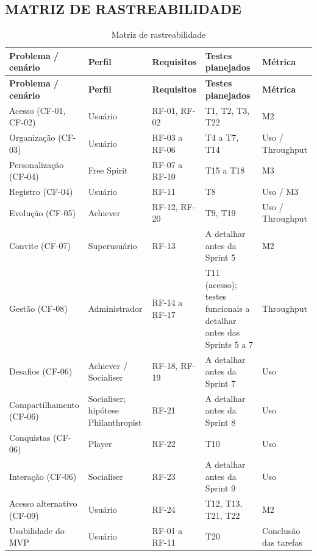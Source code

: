 \subsection{MATRIZ DE RASTREABILIDADE}

\begingroup
\small
\setlength{\tabcolsep}{4pt}
\renewcommand{\arraystretch}{1.2}
\begin{longtable}{|>{\raggedright\arraybackslash}p{}|>{\raggedright\arraybackslash}p{}|>{\raggedright\arraybackslash}p{}|>{\raggedright\arraybackslash}p{}|>{\raggedright\arraybackslash}p{}|}
\caption{Matriz de rastreabilidade}\\
\hline
\textbf{Problema / cenário} & \textbf{Perfil} & \textbf{Requisitos} & \textbf{Testes planejados} & \textbf{Métrica} \\ \hline
\endfirsthead
\textbf{Problema / cenário} & \textbf{Perfil} & \textbf{Requisitos} & \textbf{Testes planejados} & \textbf{Métrica} \\ \hline
\endhead
Acesso (CF-01, CF-02) & Usuário & RF-01, RF-02 & T1, T2, T3, T22 & M2 \\ \hline
Organização (CF-03) & Usuário & RF-03 a RF-06 & T4 a T7, T14 & Uso / Throughput \\ \hline
Personalização (CF-04) & Free Spirit & RF-07 a RF-10 & T15 a T18 & M3 \\ \hline
Registro (CF-04) & Usuário & RF-11 & T8 & Uso / M3 \\ \hline
Evolução (CF-05) & Achiever & RF-12, RF-20 & T9, T19 & Uso / Throughput \\ \hline
Convite (CF-07) & Superusuário & RF-13 & A detalhar antes da Sprint 5 & M2 \\ \hline
Gestão (CF-08) & Administrador & RF-14 a RF-17 & T11 (acesso); testes funcionais a detalhar antes das Sprints 5 a 7 & Throughput \\ \hline
Desafios (CF-06) & Achiever / Socialiser & RF-18, RF-19 & A detalhar antes da Sprint 7 & Uso \\ \hline
Compartilhamento (CF-06) & Socialiser; hipótese Philanthropist & RF-21 & A detalhar antes da Sprint 8 & Uso \\ \hline
Conquistas (CF-06) & Player & RF-22 & T10 & Uso \\ \hline
Interação (CF-06) & Socialiser & RF-23 & A detalhar antes da Sprint 9 & Uso \\ \hline
Acesso alternativo (CF-09) & Usuário & RF-24 & T12, T13, T21, T22 & M2 \\ \hline
Usabilidade do MVP & Usuário & RF-01 a RF-11 & T20 & Conclusão das tarefas \\ \hline
\end{longtable}
\endgroup


